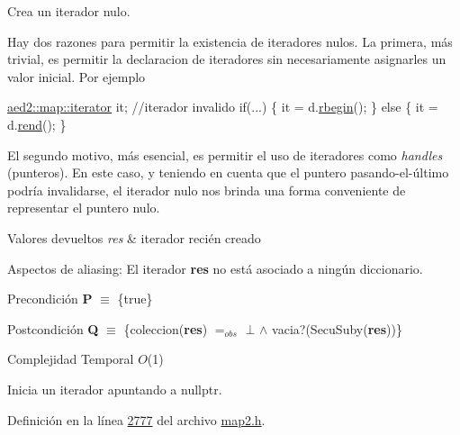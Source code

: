 Crea un iterador nulo. 

Hay dos razones para permitir la existencia de iteradores nulos. La primera, más trivial, es permitir la declaracion de iteradores sin necesariamente asignarles un valor inicial. Por ejemplo 
\begin{DoxyCode}
\hyperlink{classaed2_1_1map_1_1iterator}{aed2::map::iterator} it;   \textcolor{comment}{//iterador invalido}
\textcolor{keywordflow}{if}(...) \{
  it = d.\hyperlink{classaed2_1_1map_ac412d3902112122c1bffe2d4283a4e9d_ac412d3902112122c1bffe2d4283a4e9d}{rbegin}();
\} \textcolor{keywordflow}{else} \{
  it = d.\hyperlink{classaed2_1_1map_a277f03b4f4b6b98879e4e4921081801f_a277f03b4f4b6b98879e4e4921081801f}{rend}();
\}
\end{DoxyCode}
 El segundo motivo, más esencial, es permitir el uso de iteradores como {\itshape handles} (punteros). En este caso, y teniendo en cuenta que el puntero pasando-\/el-\/último podría invalidarse, el iterador nulo nos brinda una forma conveniente de representar el puntero nulo.


\begin{DoxyRetVals}{Valores devueltos}
{\em res} & iterador recién creado\\
\hline
\end{DoxyRetVals}
\begin{DoxyParagraph}{Aspectos de aliasing\+:}
El iterador {\bfseries res} no está asociado a ningún diccionario.
\end{DoxyParagraph}
\begin{DoxyPrecond}{Precondición}
{\bfseries P} $\equiv$ \{true\} 
\end{DoxyPrecond}
\begin{DoxyPostcond}{Postcondición}
{\bfseries Q} $\equiv$ \{coleccion({\bfseries res}) $=_{obs}$ $\bot$ $\land$ vacia?(Secu\+Suby({\bfseries res}))\}
\end{DoxyPostcond}

\begin{DoxyDescription}
\item[Complejidad Temporal]$O$(1)
\end{DoxyDescription}

Inicia un iterador apuntando a nullptr. 

Definición en la línea \hyperlink{map2_8h_source_l02777}{2777} del archivo \hyperlink{map2_8h_source}{map2.\+h}.

\mbox{\label{classaed2_1_1iterator_1_1iterator_ae005a5a576e31702ee17841c74e55684_ae005a5a576e31702ee17841c74e55684}} 
